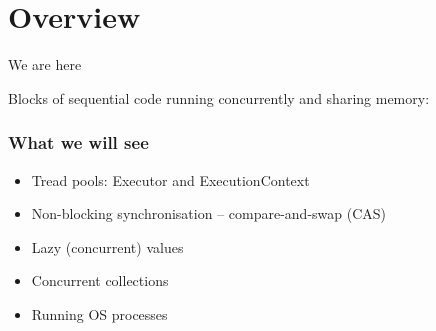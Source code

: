 \documentclass[aspectratio=169]{beamer}
\begin{document}


\section{Overview}

\begin{frame}{We are here}

  \vspace*{-2mm}

  \begin{block}{Blocks of sequential code running concurrently and sharing memory:}
    
  \end{block}
\end{frame}






\begin{frame}[t]\frametitle{What we will see}

  \begin{itemize}
    \item Tread pools: Executor and ExecutionContext
    \item Non-blocking synchronisation -- compare-and-swap (CAS)
    \item Lazy (concurrent) values
    \item Concurrent collections
    \item Running OS processes
  \end{itemize}


\end{frame}
\end{document}

